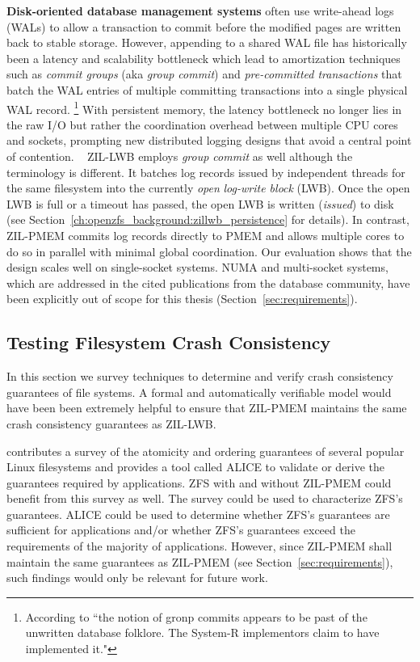 \documentclass[12pt,a4paper,twoside]{book}
\begin{document}
\textbf{Disk-oriented database management systems} often use write-ahead logs (WALs) to allow a transaction to commit before the modified pages are written back to stable storage.
However, appending to a shared WAL file has historically been a latency and scalability bottleneck which lead to amortization techniques such as \textit{commit groups} (aka \textit{group commit}) and \textit{pre-committed transactions} that batch the WAL entries of multiple committing transactions into a single physical WAL record.%
\footnote{According to \cite{dewittImplementationTechniquesMain1984} ``the notion of gronp commits appears to be past of the unwritten database folklore. The System-R implementors claim to have implemented it."}
With persistent memory, the latency bottleneck no longer lies in the raw I/O but rather the coordination overhead between multiple CPU cores and sockets, prompting new distributed logging designs that avoid a central point of contention.%
~\cite{fangHighPerformanceDatabase2011,pelleyStorageManagementNVRAM2013,johnsonAetherScalableApproach2010}
ZIL-LWB employs \textit{group commit} as well although the terminology is different.
It batches log records issued by independent threads for the same filesystem into the currently \textit{open} \textit{log-write block} (LWB).
Once the open LWB is full or a timeout has passed, the open LWB is written (\textit{issued}) to disk (see Section~\ref{ch:openzfs_background:zillwb_persistence} for details).
In contrast, ZIL-PMEM commits log records directly to PMEM and allows multiple cores to do so in parallel with minimal global coordination.
Our evaluation shows that the design scales well on single-socket systems.
NUMA and multi-socket systems, which are addressed in the cited publications from the database community, have been explicitly out of scope for this thesis (Section~\ref{sec:requirements}).

\subsection{Testing Filesystem Crash Consistency}
In this section we survey techniques to determine and verify crash consistency guarantees of file systems.
A formal and automatically verifiable model would have been been extremely helpful to ensure that ZIL-PMEM maintains the same crash consistency guarantees as ZIL-LWB.

 contributes a survey of the atomicity and ordering guarantees of several popular Linux filesystems and provides a tool called ALICE to validate or derive the guarantees required by applications.
ZFS with and without ZIL-PMEM could benefit from this survey as well.
The survey could be used to characterize ZFS’s guarantees.
ALICE could be used to determine whether ZFS’s guarantees are sufficient for applications and/or whether ZFS’s guarantees exceed the requirements of the majority of applications.
However, since ZIL-PMEM shall maintain the same guarantees as ZIL-PMEM (see Section~\ref{sec:requirements}), such findings would only be relevant for future work.
\end{document}
